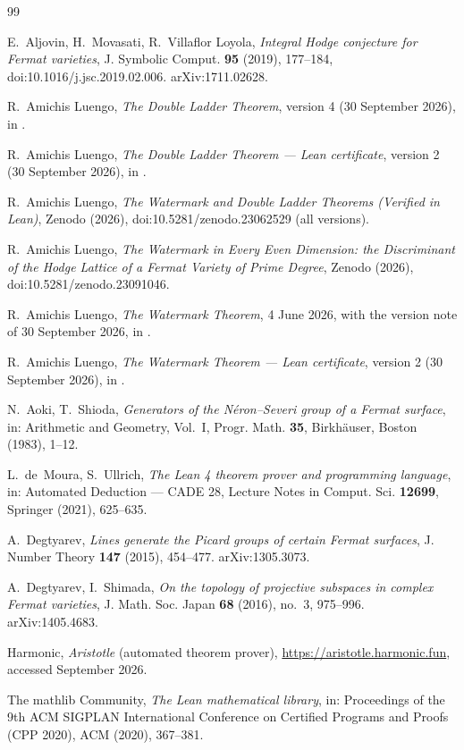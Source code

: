\documentclass[11pt]{article}
\theoremstyle{definition}
\theoremstyle{remark}
\begin{document}
\begin{thebibliography}{99}\raggedright
{} E.~Aljovin, H.~Movasati, R.~Villaflor Loyola, \emph{Integral Hodge conjecture for Fermat varieties}, J. Symbolic Comput. \textbf{95} (2019), 177--184, doi:10.1016/j.jsc.2019.02.006. arXiv:1711.02628.

 R.~Amichis Luengo, \emph{The Double Ladder Theorem}, version 4 (30 September 2026), in \cite{WMDLZenodo}.

 R.~Amichis Luengo, \emph{The Double Ladder Theorem --- Lean certificate}, version 2 (30 September 2026), in \cite{WMDLZenodo}.

 R.~Amichis Luengo, \emph{The Watermark and Double Ladder Theorems (Verified in Lean)}, Zenodo (2026), doi:10.5281/zenodo.23062529 (all versions).

 R.~Amichis Luengo, \emph{The Watermark in Every Even Dimension: the Discriminant of the Hodge Lattice of a Fermat Variety of Prime Degree}, Zenodo (2026), doi:10.5281/zenodo.23091046.

 R.~Amichis Luengo, \emph{The Watermark Theorem}, 4 June 2026, with the version note of 30 September 2026, in \cite{WMDLZenodo}.

 R.~Amichis Luengo, \emph{The Watermark Theorem --- Lean certificate}, version 2 (30 September 2026), in \cite{WMDLZenodo}.

 N.~Aoki, T.~Shioda, \emph{Generators of the N\'eron--Severi group of a Fermat surface}, in: Arithmetic and Geometry, Vol.~I, Progr. Math. \textbf{35}, Birkh\"auser, Boston (1983), 1--12.

 L.~de~Moura, S.~Ullrich, \emph{The Lean 4 theorem prover and programming language}, in: Automated Deduction --- CADE 28, Lecture Notes in Comput. Sci. \textbf{12699}, Springer (2021), 625--635.

 A.~Degtyarev, \emph{Lines generate the Picard groups of certain Fermat surfaces}, J. Number Theory \textbf{147} (2015), 454--477. arXiv:1305.3073.

 A.~Degtyarev, I.~Shimada, \emph{On the topology of projective subspaces in complex Fermat varieties}, J. Math. Soc. Japan \textbf{68} (2016), no.~3, 975--996. arXiv:1405.4683.

 Harmonic, \emph{Aristotle} (automated theorem prover), \url{https://aristotle.harmonic.fun}, accessed September 2026.

 The mathlib Community, \emph{The Lean mathematical library}, in: Proceedings of the 9th ACM SIGPLAN International Conference on Certified Programs and Proofs (CPP 2020), ACM (2020), 367--381.


\end{thebibliography}
\end{document}
